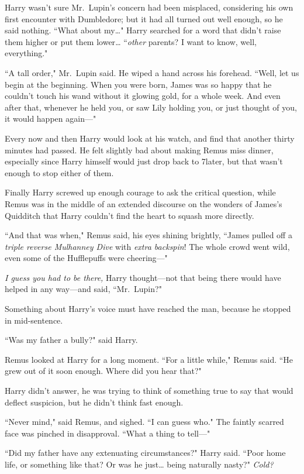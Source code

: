 Harry wasn't sure Mr.~Lupin's concern had been misplaced, considering his own first encounter with Dumbledore; but it had all turned out well enough, so he said nothing. ``What about my{\ldots}" Harry searched for a word that didn't raise them higher or put them lower{\ldots} ``\emph{other} parents? I want to know, well, everything."

``A tall order," Mr.~Lupin said. He wiped a hand across his forehead. ``Well, let us begin at the beginning. When you were born, James was so happy that he couldn't touch his wand without it glowing gold, for a whole week. And even after that, whenever he held you, or saw Lily holding you, or just thought of you, it would happen again---"

\later

Every now and then Harry would look at his watch, and find that another thirty minutes had passed. He felt slightly bad about making Remus miss dinner, especially since Harry himself would just drop back to 7\pm later, but that wasn't enough to stop either of them.

Finally Harry screwed up enough courage to ask the critical question, while Remus was in the middle of an extended discourse on the wonders of James's Quidditch that Harry couldn't find the heart to squash more directly.

``And that was when," Remus said, his eyes shining brightly, ``James pulled off a \emph{triple reverse Mulhanney Dive} with \emph{extra backspin}! The whole crowd went wild, even some of the Hufflepuffs were cheering---"

\emph{I guess you had to be there,} Harry thought---not that being there would have helped in any way---and said, ``Mr.~Lupin?"

Something about Harry's voice must have reached the man, because he stopped in mid-sentence.

``Was my father a bully?" said Harry.

Remus looked at Harry for a long moment. ``For a little while," Remus said. ``He grew out of it soon enough. Where did you hear that?"

Harry didn't answer, he was trying to think of something true to say that would deflect suspicion, but he didn't think fast enough.

``Never mind," said Remus, and sighed. ``I can guess who." The faintly scarred face was pinched in disapproval. ``What a thing to tell---"

``Did my father have any extenuating circumstances?" Harry said. ``Poor home life, or something like that? Or was he just{\ldots} being naturally nasty?" \emph{Cold?}

